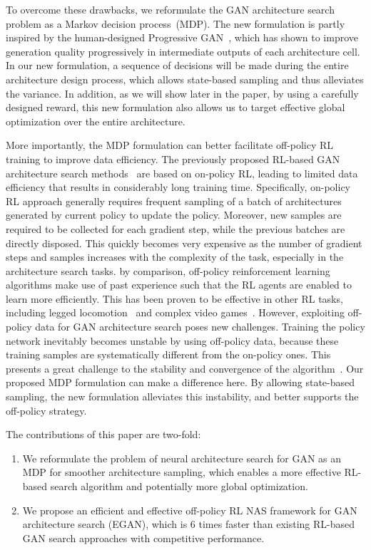 \documentclass[runningheads]{llncs}
\begin{document}
To overcome these drawbacks, we reformulate the GAN architecture search problem as a Markov decision process~(MDP). The new formulation is partly inspired by the human-designed Progressive GAN~\cite{karras2017progressive}, which has shown to improve generation quality progressively in intermediate outputs of each architecture cell. In our new formulation, a sequence of decisions will be made during the entire architecture design process, which allows state-based sampling and thus alleviates the variance. In addition, as we will show later in the paper, by using a carefully designed reward, this new formulation also allows us to target effective global optimization over the entire architecture.   


More importantly, the MDP formulation can better facilitate off-policy RL training to improve data efficiency. The previously proposed RL-based GAN architecture search methods~\cite{gong2019autogan,wang2019agan} are based on on-policy RL, leading to limited data efficiency that results in considerably long training time. 
Specifically, on-policy RL approach generally requires frequent sampling of a batch of architectures generated by current policy to update the policy.
Moreover, new samples are required to be collected for each gradient step, while the previous batches are directly disposed. This quickly becomes very expensive as the number of gradient steps and samples increases with the complexity of the task, especially in the architecture search tasks. by comparison, off-policy reinforcement learning algorithms make use of past experience such that the RL agents are enabled to learn more efficiently. This has been proven to be effective in other RL tasks, including legged locomotion~\cite{lillicrap2015continuous} and complex video games~\cite{mnih2015human}. However, exploiting off-policy data for GAN architecture search poses new challenges. Training the policy network inevitably becomes unstable by using off-policy data, because these training samples are systematically different from the on-policy ones. This presents a great challenge to the stability and convergence of the algorithm~\cite{bhatnagar2009convergent}. Our proposed MDP formulation can make a difference here. By allowing state-based sampling, the new formulation alleviates this instability, and better supports the off-policy strategy. 


The contributions of this paper are two-fold: 


\begin{enumerate}
   \item We reformulate the problem of neural architecture search for GAN as an MDP for smoother architecture sampling, which enables a more effective RL-based search algorithm and potentially more global optimization.
  \item We propose an efficient and effective off-policy RL NAS framework for GAN architecture search (EGAN), which is 6 times faster than existing RL-based GAN search approaches with competitive performance. 
\end{enumerate}
\end{document}
